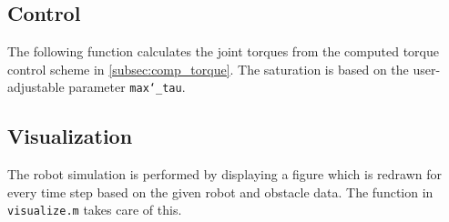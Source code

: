 


\subsection{Control}
The following function calculates the joint torques from the computed torque control scheme in \ref{subsec:comp_torque}. The saturation is based on the user-adjustable parameter \texttt{max\char`_tau}.



\subsection{Visualization}

The robot simulation is performed by displaying a figure which is redrawn for every time step based on the given robot and obstacle data. The function in \texttt{visualize.m} takes care of this.

